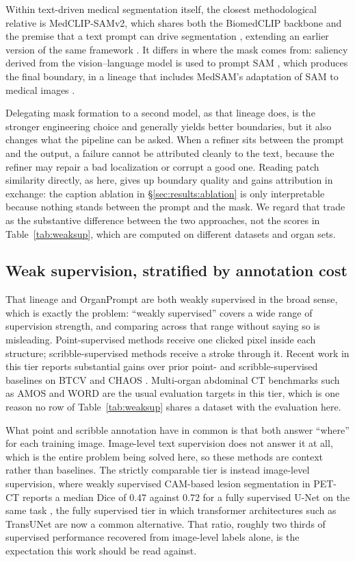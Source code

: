 Within text-driven medical segmentation itself, the closest methodological
relative is MedCLIP-SAMv2, which shares both the BiomedCLIP backbone and the
premise that a text prompt can drive segmentation
\cite{koleilat2025medclipsamv2}, extending an earlier version of the same
framework \cite{koleilat2024medclipsam}. It differs in where the mask comes from:
saliency derived from the vision--language model is used to prompt SAM
\cite{kirillov2023sam}, which produces the final boundary, in a lineage that
includes MedSAM's adaptation of SAM to medical images \cite{ma2024medsam}.

Delegating mask formation to a second model, as that lineage does, is the
stronger engineering choice and generally yields better boundaries, but it also
changes what the pipeline can be asked. When a refiner sits between the prompt
and the output, a failure cannot be attributed cleanly to the text, because the
refiner may repair a bad localization or corrupt a good one. Reading patch
similarity directly, as here, gives up boundary quality and gains attribution in
exchange: the caption ablation in \S\ref{sec:results:ablation} is only
interpretable because nothing stands between the prompt and the mask. We regard
that trade as the substantive difference between the two approaches, not the
scores in Table~\ref{tab:weaksup}, which are computed on different datasets and
organ sets.

\subsection{Weak supervision, stratified by annotation cost}

That lineage and OrganPrompt are both weakly supervised in the broad sense,
which is exactly the problem: ``weakly supervised'' covers a wide range of
supervision strength, and comparing across that range without saying so is
misleading.
Point-supervised methods receive one clicked pixel inside each structure;
scribble-supervised methods receive a stroke through it. Recent work in this
tier reports substantial gains
over prior point- and scribble-supervised baselines on BTCV and CHAOS
\cite{jiang2024probabilistic}. Multi-organ abdominal CT benchmarks such as AMOS
\cite{ji2022amos} and WORD \cite{luo2022word} are the usual evaluation targets in
this tier, which is one reason no row of Table~\ref{tab:weaksup} shares a dataset
with the evaluation here.

What point and scribble annotation have in common is that both answer ``where''
for each training image. Image-level text supervision does not answer it at all,
which is the entire problem being solved here, so these methods are context
rather than baselines. The strictly comparable tier is instead image-level
supervision, where weakly supervised CAM-based lesion segmentation in PET-CT
reports a median Dice of 0.47 against 0.72 for a fully supervised U-Net
\cite{ronneberger2015unet} on the same task \cite{fruh2021petct}, the fully
supervised tier in which transformer architectures such as TransUNet
\cite{chen2021transunet} are now a common alternative. That ratio, roughly two
thirds of supervised performance recovered from image-level labels alone, is the
expectation this work should be read against.

